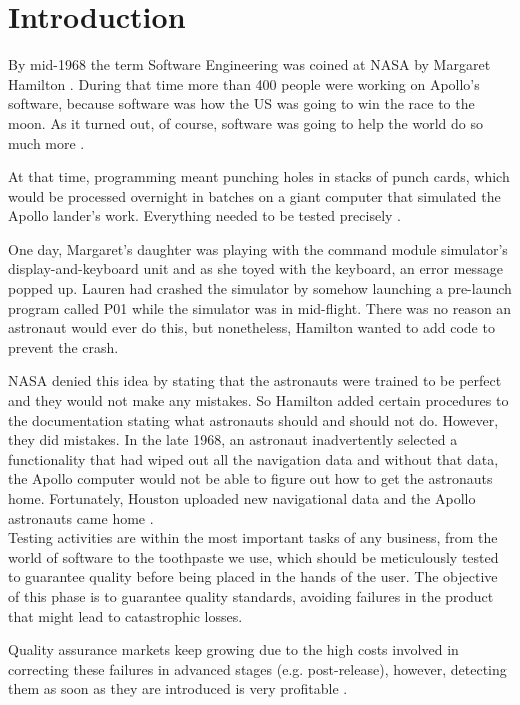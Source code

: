 \chapter{Introduction}
\label{ch:introduction}


By mid-1968 the term Software Engineering was coined at NASA by Margaret Hamilton \cite{first_sw_engineer}. During that time more than 400 people were working on Apollo’s software, because software was how the US was going to win the race to the moon. As it turned out, of course, software was going to help the world do so much more \cite{mcmillan_her_nodate}. 

At that time, programming meant punching holes in stacks of punch cards, which would be processed overnight in batches on a giant computer that simulated the Apollo lander’s work. Everything needed to be tested precisely \cite{mcmillan_her_nodate}.

One day, Margaret’s daughter was playing with the command module simulator’s display-and-keyboard unit and as she toyed with the keyboard, an error message popped up. Lauren had crashed the simulator by somehow launching a pre-launch program called P01 while the simulator was in mid-flight. There was no reason an astronaut would ever do this, but nonetheless, Hamilton wanted to add code to prevent the crash.

NASA denied this idea by stating that the astronauts were trained to be perfect and they would not make any mistakes. So Hamilton added certain procedures to the documentation stating what astronauts should and should not do. However, they did mistakes. In the late 1968, an astronaut inadvertently selected a functionality that had wiped out all the navigation data and without that data, the Apollo computer would not be able to figure out how to get the astronauts home. Fortunately, Houston uploaded new navigational data and the Apollo astronauts came home \cite{first_sw_engineer} \cite{mcmillan_her_nodate}.\\

Testing activities are within the most important tasks of any business, from the world of software to the toothpaste we use, which should be meticulously tested to guarantee quality before being placed in the hands of the user. The objective of this phase is to guarantee quality standards, avoiding failures in the product that might lead to catastrophic losses.

Quality assurance markets keep growing due to the high costs involved in correcting these failures in advanced stages (e.g. post-release), however, detecting them as soon as they are introduced is very profitable \cite{hernandez_history_2020}.

